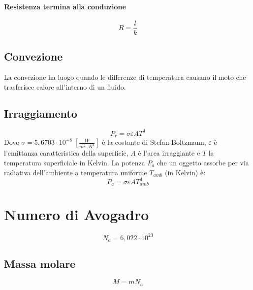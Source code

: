             \paragraph{Resistenza termina alla conduzione}
                \begin{equation*}
                    R = \frac{l}{k}
                \end{equation*}

            \subsection*{Convezione} La convezione ha luogo quando le differenze
            di temperatura causano il moto che trasferisce calore all'interno 
            di un fluido.

            \subsection*{Irraggiamento}
                \begin{equation*}
                    P_r = \sigma \varepsilon AT^4
                \end{equation*}
            Dove $\sigma = 5,6703 \cdot 10^{-8} \; [\frac{W}{m^2 \cdot K^4}
            ]$ è la costante di Stefan-Boltzmann, $\varepsilon$ è l'emittanza
            caratteristica della superficie, $A$ è l'area irraggiante e $T$ la 
            temperatura superficiale in Kelvin. La potenza $P_a$ che un oggetto
            assorbe per via radiativa dell'ambiente a temperatura uniforme
            $T_{amb}$ (in Kelvin) è:
                \begin{equation*}
                    P_a = \sigma \varepsilon AT^4_{amb}
                \end{equation*}

    \section*{Numero di Avogadro}
        \begin{equation*}
            N_a = 6,022 \cdot 10^{23}
        \end{equation*}

        \subsection*{Massa molare}
            \begin{equation*}
                M = mN_a
            \end{equation*}
        
